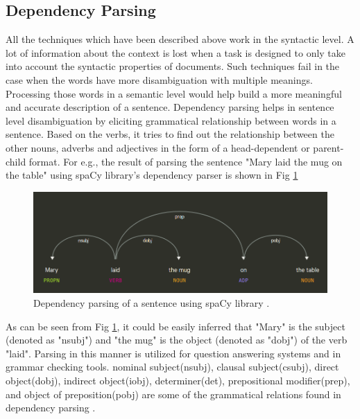 	\subsection{Dependency Parsing}
	
	All the techniques which have been described above work in the syntactic level. A lot of information about the context is lost when a task is designed to only take into account the syntactic properties of documents. Such techniques fail in the case when the words have more disambiguation with multiple meanings. Processing those words in a semantic level would help build a more meaningful and accurate description of a sentence. Dependency parsing helps in sentence level disambiguation by eliciting grammatical relationship between words in a sentence. Based on the verbs, it tries to find out the relationship between the other nouns, adverbs and adjectives in the form of a head-dependent or parent-child format. For e.g., the result of parsing the sentence "Mary laid the mug on the table" using spaCy library's dependency parser is shown in Fig \ref{deptree}
	
	\begin{figure}[h!]
		\centering
		\includegraphics[scale=0.3]{images/deptree}
		\caption{Dependency parsing of a sentence using spaCy library \cite{dep_visi}.}
		\label{deptree}
	\end{figure}
	   
	As can be seen from Fig \ref{deptree}, it could be easily inferred that "Mary" is the subject (denoted as "nsubj") and "the mug" is the object (denoted as "dobj") of the verb "laid". Parsing in this manner is utilized for question answering systems and in grammar checking tools. nominal subject(nsubj), clausal subject(csubj), direct object(dobj), indirect object(iobj), determiner(det), prepositional modifier(prep), and object of preposition(pobj) are some of the grammatical relations found in dependency parsing \cite{de2008stanford}.

